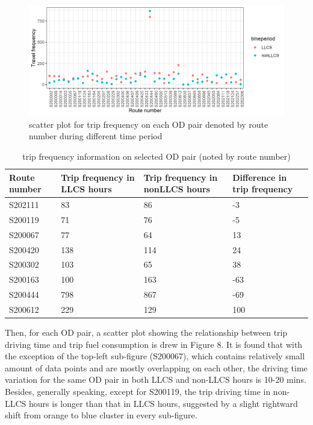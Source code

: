 \documentclass[preprint,12pt,3p]{elsarticle}
\begin{document}
\begin{figure}[H] %
\centering %

\includegraphics[scale=0.9]{routefreq.png} %
\caption{scatter plot for trip frequency on each OD pair denoted by route number during different time period} %
\label{fig7}
\end{figure}




\begin{table}[H]
\footnotesize
\centering
\caption{trip frequency information on selected OD pair (noted by route number)}
\label{tbl7}
\begin{tabular}{m{2cm}<{\centering} m{4cm}<{\centering} m{4cm}<{\centering} m{3cm}<{\centering}}
\toprule[1.2pt]
  \textbf{Route number} &\textbf{Trip frequency in LLCS hours} &\textbf{Trip frequency in nonLLCS hours} &\textbf{Difference in trip frequency} \\


  \midrule
   S202111 & 83 & 86 & -3\\
   S200119 & 71 & 76 & -5\\
   S200067 & 77 & 64 & 13\\
   S200420 & 138 & 114 & 24\\
   S200302 & 103 & 65 & 38\\
   S200163 & 100 & 163 & -63\\
   S200444 & 798 & 867 & -69\\
   S200612 & 229 & 129 & 100\\
   
  \bottomrule[1.2pt]
  \end{tabular}
\end{table}

Then, for each OD pair, a scatter plot showing the relationship between trip driving time and trip fuel consumption is drew in Figure 8. It is found that with the exception of the top-left sub-figure (S200067), which contains relatively small amount of data points and are mostly overlapping on each other, the driving time variation for the same OD pair in both LLCS and non-LLCS hours is 10-20 mins. Besides, generally speaking, except for S200119, the trip driving time in non-LLCS hours is longer than that in LLCS hours, suggested by a slight rightward shift from orange to blue cluster in every sub-figure. 
\end{document}
